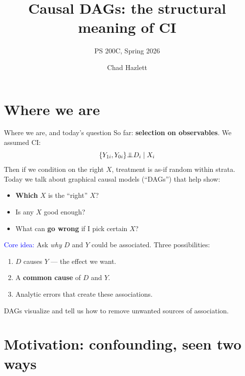 \documentclass[xcolor=dvipsnames]{beamer}
\title[DAGs]{Causal DAGs: the structural meaning of CI}
\subtitle[ ]{PS 200C, Spring 2026}
\author{Chad Hazlett}
\institute[UCLA]{UCLA\\[1ex]
  \texttt{chazlett@ucla.edu}}
\date{}
\newcommand{\indep}{{\bot\negthickspace\negthickspace\bot}}
\begin{document}
\begin{frame}
  \titlepage
\end{frame}


\section{Where we are}

\begin{frame}{Where we are, and today's question}
\small
{} So far: \textbf{selection on observables}.  We assumed CI:
$$\{Y_{1i}, Y_{0i}\} \indep D_i \mid X_i$$
Then if we condition on the right $X$, treatment is as-if random within strata.\\[6pt]

 Today we talk about graphical causal models (``DAGs'') that help show:
\begin{itemize}
\footnotesize
\item<2-> \textbf{Which} $X$ is the ``right'' $X$?
\item<3-> Is any $X$ good enough?
\item<3-> What can \textbf{go wrong} if I pick certain $X$?
\end{itemize}

\bigskip
{} \textcolor{Blue}{Core idea:} Ask \textit{why} $D$ and $Y$ could be associated. Three possibilities:
\begin{enumerate}
\footnotesize
\item<4-> $D$ causes $Y$ --- the effect we want.
\item<5-> A \textbf{common cause} of $D$ and $Y$.
\item<6-> Analytic errors that create these associations. 
\end{enumerate}

 DAGs visualize and tell us how to remove unwanted sources of association. 
\end{frame}


\section{Motivation: confounding, seen two ways}
\end{document}
